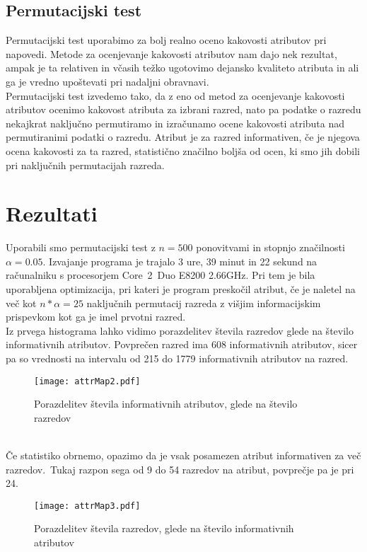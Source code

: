 \documentclass[a4paper,11pt]{article}
\begin{document}
\subsection{Permutacijski test}
Permutacijski test uporabimo za bolj realno oceno kakovosti atributov pri napovedi. Metode za ocenjevanje kakovosti atributov nam dajo nek rezultat, ampak je ta relativen in včasih težko ugotovimo dejansko kvaliteto atributa in ali ga je vredno upoštevati pri nadaljni obravnavi.\\

Permutacijski test izvedemo tako, da z eno od metod za ocenjevanje kakovosti atributov ocenimo kakovost atributa za izbrani razred, nato pa podatke o razredu nekajkrat naključno permutiramo in izračunamo ocene kakovosti atributa nad permutiranimi podatki o razredu. Atribut je za razred informativen, če je njegova ocena kakovosti za ta razred, statistično značilno boljša od ocen, ki smo jih dobili pri naključnih permutacijah razreda.

\section{Rezultati}

Uporabili smo permutacijski test z $n=500$ ponovitvami in stopnjo značilnosti $\alpha=0.05$. Izvajanje programa je trajalo 3 ure, 39 minut in 22 sekund na računalniku s procesorjem Core~2~Duo E8200 2.66GHz. Pri tem je bila uporabljena optimizacija, pri kateri je program preskočil atribut, če je naletel na več kot $n*\alpha=25$ naključnih permutacij razreda z višjim informacijskim prispevkom kot ga je imel prvotni razred.\\

Iz prvega histograma lahko vidimo porazdelitev števila razredov glede na število informativnih atributov. Povprečen razred ima 608 informativnih atributov, sicer pa so vrednosti na intervalu od 215 do 1779 informativnih atributov na razred.
\begin{figure}[H]
\begin{center}
\texttt{[image: attrMap2.pdf]}
\caption{Porazdelitev števila informativnih atributov, glede na število razredov}
\label{slika1}
\end{center}
\end{figure}\ \\[-40pt]

Če statistiko obrnemo, opazimo da je vsak posamezen atribut informativen za več razredov.~Tukaj razpon sega od 9 do 54 razredov na atribut, povprečje pa je pri 24.
\begin{figure}[H]
\begin{center}
\texttt{[image: attrMap3.pdf]}
\caption{Porazdelitev števila razredov, glede na število informativnih atributov}
\label{slika1}
\end{center}
\end{figure}\ \\[-40pt]
\end{document}
